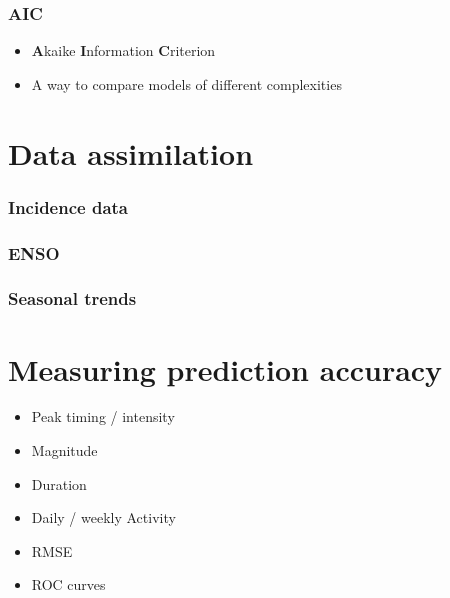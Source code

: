 \documentclass[10pt]{beamer}
\begin{document}
		\begin{frame}
			\frametitle{AIC}
			\begin{itemize}
				\item {\bf A}kaike {\bf I}nformation {\bf C}riterion
				\item A way to compare models of different complexities
			\end{itemize}
		\end{frame}


	\section{Data assimilation}

		\begin{frame}
			\frametitle{Incidence data}
		\end{frame}

		\begin{frame}
			\frametitle{ENSO}
		\end{frame}

		\begin{frame}
			\frametitle{Seasonal trends}
		\end{frame}

	\section{Measuring prediction accuracy}

		\begin{frame}
			\begin{itemize}
				\item Peak timing / intensity
				\item Magnitude
				\item Duration
				\item Daily / weekly Activity
				\item RMSE
				\item ROC curves
			\end{itemize}
		\end{frame}


		
		
\end{document}

